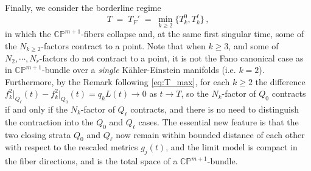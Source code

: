 \documentclass[11pt]{amsart}
\theoremstyle{plain}
\numberwithin{equation}{section}
\theoremstyle{definition}
\theoremstyle{remark}
\begin{document}
Finally, we consider the borderline regime
\[T \;=\; T_F' \;=\; \min_{k \geq 2}\big\{T_k^0, T_k^\ell\big\}\,,\]
in which the $\mathbb{CP}^{m+1}$-fibers collapse and, at the same first singular time, some of the $N_{k\geq 2}$-factors contract to a point. Note that when $k \geq 3$, and some of $N_2, \cdots, N_r$-factors do not contract to a point, it is not the Fano canonical case as in $\mathbb{CP}^{m+1}$-bundle over a \emph{single} K\"ahler-Einstein manifolds (i.e. $k = 2$). Furthermore, by the Remark following \eqref{eq:T_max}, for each $k \geq 2$ the difference $f_k^2\big|_{Q_\ell}(t) - f_k^2\big|_{Q_0}(t) = q_kL(t) \to 0$ as $t \to T$, so the $N_k$-factor of $Q_0$ contracts if and only if the $N_k$-factor of $Q_\ell$ contracts, and there is no need to distinguish the contraction into the $Q_0$ and $Q_\ell$ cases. The essential new feature is that the two closing strata $Q_0$ and $Q_\ell$ now remain within bounded distance of each other with respect to the rescaled metrics $g_j(t)$, and the limit model is compact in the fiber directions, and is the total space of a $\mathbb{CP}^{m+1}$-bundle.
\end{document}
